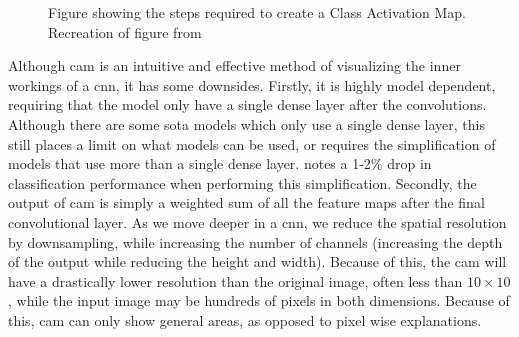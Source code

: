 \documentclass[UKenglish]{uiomasterthesis} %
\theoremstyle{definition}
\begin{document}
\begin{figure}[H]
\begin{center}

    \end{center}
    \caption[CNN example]{Figure showing the steps required to create a Class Activation Map. Recreation of figure from \cite{cam}}
    \label{fig:cam}
\end{figure}

Although \ac{cam} is an intuitive and effective method of visualizing the inner workings of a \ac{cnn}, it has some downsides. Firstly, it is highly model dependent, requiring that the model only have a single dense layer after the convolutions. Although there are some \ac{sota} models which only use a single dense layer, this still places a limit on what models can be used, or requires the simplification of models that use more than a single dense layer. \cite[4]{cam} notes a 1-2\% drop in classification performance when performing this simplification. Secondly, the output of \ac{cam} is simply a weighted sum of all the feature maps after the final convolutional layer. As we move deeper in a \ac{cnn}, we reduce the spatial resolution by downsampling, while increasing the number of channels (increasing the depth of the output while reducing the height and width). Because of this, the \ac{cam} will have a drastically lower resolution than the original image, often less than $10 \times 10$, while the input image may be hundreds of pixels in both dimensions. Because of this, \ac{cam} can only show general areas, as opposed to pixel wise explanations.
\\
\end{document}
